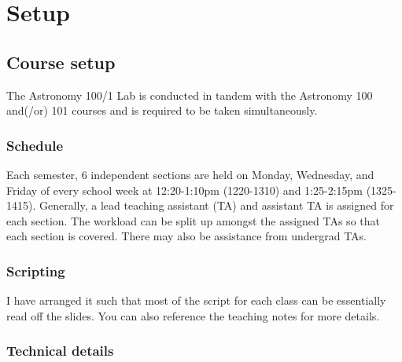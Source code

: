 \documentclass[12pt]{article}
\begin{document}
\section{Setup}

\subsection{Course setup}

The Astronomy 100/1 Lab is conducted in tandem with the Astronomy 100 and(/or) 101 courses and is required to be taken simultaneously.


\subsubsection{Schedule}

Each semester, 6 independent sections are held on Monday, Wednesday, and Friday of every school week at 12:20-1:10pm (1220-1310) and 1:25-2:15pm (1325-1415). Generally, a lead teaching assistant (TA) and assistant TA is assigned for each section. The workload can be split up amongst the assigned TAs so that each section is covered. There may also be assistance from undergrad TAs.


\subsubsection{Scripting}

I have arranged it such that most of the script for each class can be essentially read off the slides. You can also reference the teaching notes for more details.


\subsubsection{Technical details}
\end{document}
